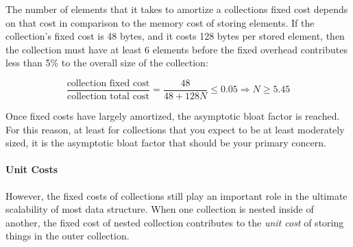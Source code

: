 The number of elements that it takes to amortize a collections fixed cost
depends on that cost in comparison to the memory cost of storing elements. If
the collection's fixed cost is 48 bytes, and it costs 128 bytes per stored
element, then the collection must have at least 6 elements before the fixed
overhead contributes less than 5\% to the overall size of the collection:

$$\frac{\textrm{collection fixed cost}}{\textrm{collection total cost}} =
\frac{48}{48 + 128 N} \le 0.05 \Longrightarrow N \ge 5.45$$

Once fixed costs have largely amortized, the asymptotic bloat factor is reached.
For this reason, at least for collections that you expect to be at least
moderately sized, it is the asymptotic bloat factor that should be your primary
concern.

\paragraph{Unit Costs}
However, the fixed costs of collections still play an important role in the
ultimate scalability of most data structure. When one collection is nested
inside of another, the fixed cost of nested collection contributes to the
\emph{unit cost} of storing things in the outer collection.


